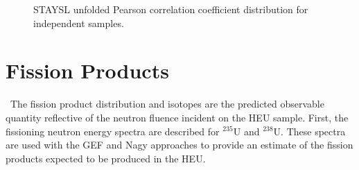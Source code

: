 \begin{figure}[!htbp]
	\centering
	\vfill
	\vfill
	\vfill
	\caption{STAYSL unfolded Pearson correlation coefficient distribution for independent samples.}
	\label{fig:unfold20}
\end{figure}

\section{Fission Products}

\ The fission product distribution and isotopes are the predicted observable quantity reflective of the neutron fluence incident on the HEU sample. 
First, the fissioning neutron energy spectra are described for $\mathrm{^{235}}$U and $\mathrm{^{238}}$U.
These spectra are used with the GEF and Nagy approaches to provide an estimate of the fission products expected to be produced in the HEU. 

